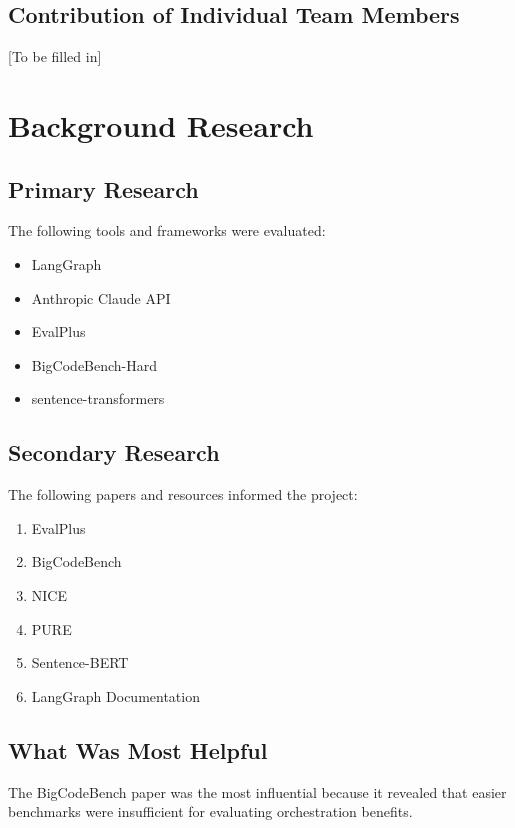 \documentclass[11pt]{article}
\begin{document}
\subsection{Contribution of Individual Team Members}

[To be filled in]

\section{Background Research}

\subsection{Primary Research}

The following tools and frameworks were evaluated:

\begin{itemize}
    \item LangGraph
    \item Anthropic Claude API
    \item EvalPlus
    \item BigCodeBench-Hard
    \item sentence-transformers
\end{itemize}

\subsection{Secondary Research}

The following papers and resources informed the project:

\begin{enumerate}
    \item EvalPlus
    \item BigCodeBench
    \item NICE
    \item PURE
    \item Sentence-BERT
    \item LangGraph Documentation
\end{enumerate}

\subsection{What Was Most Helpful}

The BigCodeBench paper was the most influential because it revealed that easier benchmarks were insufficient for evaluating orchestration benefits.
\end{document}
